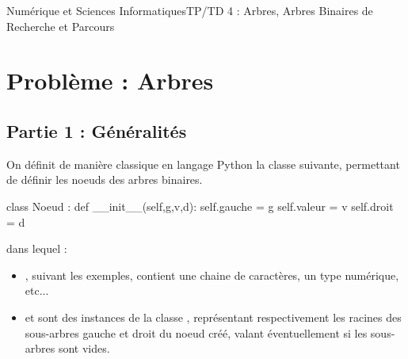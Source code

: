 \documentclass[11pt,a4paper,french,twoside]{PMCours}
\begin{document}
{Numérique et Sciences Informatiques}{TP/TD 4 : Arbres, Arbres Binaires de Recherche et Parcours}
\section*{Problème : Arbres}
\subsection*{Partie 1 : Généralités}
On définit de manière classique en langage Python la classe suivante, permettant de définir les noeuds des arbres binaires. 
\begin{Python}
class Noeud : 
	def __init__(self,g,v,d):
		self.gauche = g
		self.valeur = v
		self.droit = d
\end{Python}
dans lequel :
\begin{itemize}
\item {}, suivant les exemples, contient une chaine de caractères, un type numérique, etc...
\item {} et  sont des instances de la classe , représentant respectivement les racines des sous-arbres gauche et droit du noeud créé, valant éventuellement  si les sous-arbres sont vides. 
\end{itemize}
\end{document}
